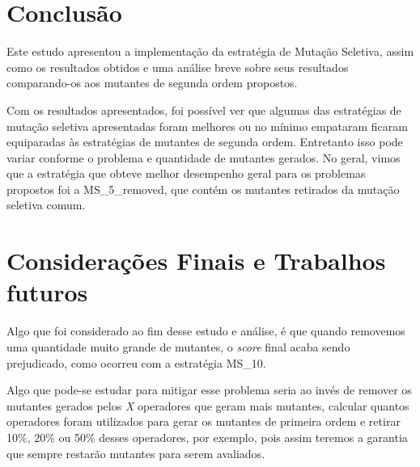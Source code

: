 \section{Conclusão}
\label{section:conclusao}
Este estudo apresentou a implementação da estratégia de Mutação Seletiva, 
assim como os resultados obtidos e uma análise breve sobre seus resultados
comparando-os aos mutantes de segunda ordem propostos.

Com os resultados apresentados, foi possível ver que algumas das 
estratégias de mutação seletiva apresentadas foram melhores ou no mínimo 
empataram ficaram equiparadas às estratégias de mutantes de segunda ordem.
Entretanto isso pode variar conforme o problema e quantidade de mutantes
gerados. No geral, vimos que a estratégia que obteve melhor desempenho
geral para os problemas propostos foi a MS\_5\_removed, que contém os 
mutantes retirados da mutação seletiva comum.

\section{Considerações Finais e Trabalhos futuros}
\label{section:future-work}
Algo que foi considerado ao fim desse estudo e análise, é que quando 
removemos uma quantidade muito grande de mutantes, o \textit{score}
final acaba sendo prejudicado, como ocorreu com a estratégia MS\_10. 

Algo que pode-se estudar para mitigar esse problema seria ao invés de
remover os mutantes gerados pelos \textit{X} operadores que geram mais
mutantes, calcular quantos operadores foram utilizados para gerar os 
mutantes de primeira ordem e retirar 10\%, 20\% ou 50\% desses operadores,
por exemplo, pois assim teremos a garantia que sempre restarão mutantes 
para serem avaliados.